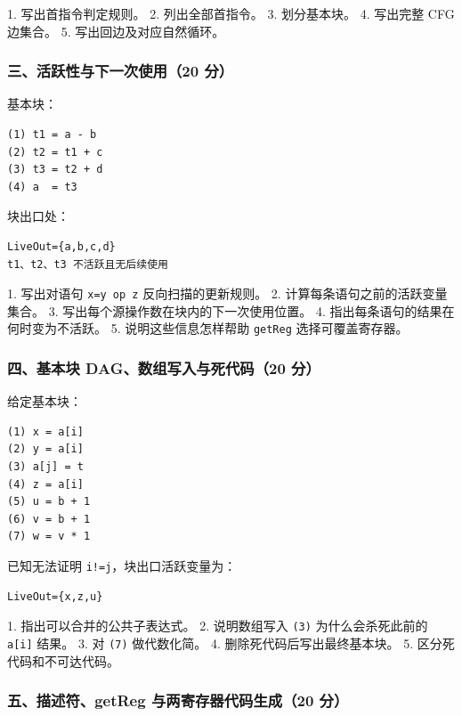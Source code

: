 \documentclass[UTF8]{ctexart}
\begin{document}
1. 写出首指令判定规则。 2. 列出全部首指令。 3. 划分基本块。 4. 写出完整 CFG 边集合。 5. 写出回边及对应自然循环。

\subsubsection*{三、活跃性与下一次使用（20 分）}

基本块：

\begin{Verbatim}[fontsize=\small,breaklines=true]
(1) t1 = a - b
(2) t2 = t1 + c
(3) t3 = t2 + d
(4) a  = t3
\end{Verbatim}

块出口处：

\begin{Verbatim}[fontsize=\small,breaklines=true]
LiveOut={a,b,c,d}
t1、t2、t3 不活跃且无后续使用
\end{Verbatim}

1. 写出对语句 \texttt{x=y op z} 反向扫描的更新规则。 2. 计算每条语句之前的活跃变量集合。 3. 写出每个源操作数在块内的下一次使用位置。 4. 指出每条语句的结果在何时变为不活跃。 5. 说明这些信息怎样帮助 \texttt{getReg} 选择可覆盖寄存器。

\subsubsection*{四、基本块 DAG、数组写入与死代码（20 分）}

给定基本块：

\begin{Verbatim}[fontsize=\small,breaklines=true]
(1) x = a[i]
(2) y = a[i]
(3) a[j] = t
(4) z = a[i]
(5) u = b + 1
(6) v = b + 1
(7) w = v * 1
\end{Verbatim}

已知无法证明 \texttt{i!=j}，块出口活跃变量为：

\begin{Verbatim}[fontsize=\small,breaklines=true]
LiveOut={x,z,u}
\end{Verbatim}

1. 指出可以合并的公共子表达式。 2. 说明数组写入 \texttt{(3)} 为什么会杀死此前的 \texttt{a[i]} 结果。 3. 对 \texttt{(7)} 做代数化简。 4. 删除死代码后写出最终基本块。 5. 区分死代码和不可达代码。

\subsubsection*{五、描述符、getReg 与两寄存器代码生成（20 分）}
\end{document}
